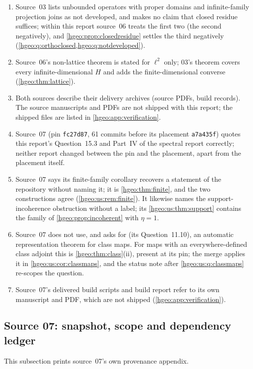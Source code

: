 \documentclass[11pt,letterpaper]{article}
\numberwithin{equation}{section}
\theoremstyle{definition}
\theoremstyle{remark}
\newcommand{\replabel}[1]{\nolinkurl{#1}}
\begin{document}
\begin{enumerate}[leftmargin=*]
the labels \replabel{ihs:hh:thm:adjoint}, \replabel{ihs:hh:thm:coercive},
\replabel{ihs:hh:thm:norm}, \replabel{duals:prop:spherical},
\replabel{duals:prop:norm}, \replabel{duals:thm:riesz}. Its description of
the spectral report as 99 pages is still that report's page count.
\item Source~03 lists unbounded operators with proper domains and
infinite-family projection joins as not developed, and makes no claim that
closed residue suffices; within this report source~06 treats the first two
(the second negatively), and \cref{hgeo:prop:closedresidue} settles the third
negatively (\cref{hgeo:q:orthoclosed,hgeo:q:notdeveloped}).
\item Source~06's non-lattice theorem is stated for $\ell^2$ only; 03's
theorem covers every infinite-dimensional $H$ and adds the finite-dimensional
converse (\cref{hgeo:thm:lattice}).
\item Both sources describe their delivery archives (source PDFs, build
records). The source manuscripts and PDFs are not shipped with this report;
the shipped files are listed in \cref{hgeo:app:verification}.
\item Source~07 (pin \texttt{fc27d87}, 61 commits before its placement
\texttt{a7a435f}) quotes this report's Question~15.3 and Part~IV of the
spectral report correctly; neither report changed between the pin and the
placement, apart from the placement itself.
\item Source~07 says its finite-family corollary recovers a statement of the
repository without naming it; it is \cref{hgeo:thm:finite}, and the two
constructions agree (\cref{hgeo:us:rem:finite}). It likewise names the
support-incoherence obstruction without a label; its
\cref{hgeo:us:thm:support} contains the family of \cref{hgeo:prop:incoherent}
with $\eta=1$.
\item Source~07 does not use, and asks for (its Question~11.10), an automatic
representation theorem for class maps. For maps with an everywhere-defined
class adjoint this is \cref{hgeo:thm:class}(ii), present at its pin; the merge
applies it in \cref{hgeo:us:cor:classmaps}, and the status note after
\cref{hgeo:us:q:classmaps} re-scopes the question.
\item Source~07's delivered build scripts and build report refer to its own
manuscript and PDF, which are not shipped (\cref{hgeo:app:verification}).
\end{enumerate}

\subsection{Source 07: snapshot, scope and dependency ledger}
\label{hgeo:us:app:provenance}
This subsection prints source~07's own provenance appendix.
\end{document}

